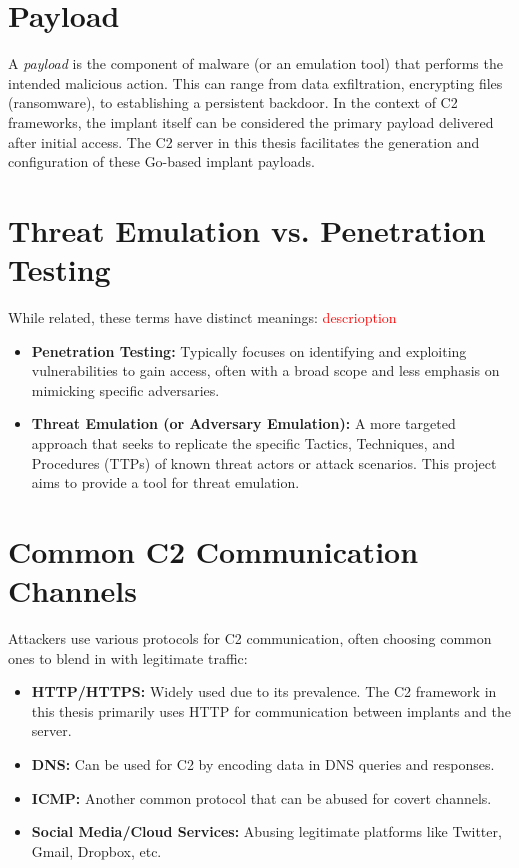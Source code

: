 \section{Payload}
\label{sec:payload_definition}
A \textit{payload} is the component of malware (or an emulation tool) that performs the intended malicious action. This can range from data exfiltration, encrypting files (ransomware), to establishing a persistent backdoor. In the context of C2 frameworks, the implant itself can be considered the primary payload delivered after initial access. The C2 server in this thesis facilitates the generation and configuration of these Go-based implant payloads.

\section{Threat Emulation vs. Penetration Testing}
\label{sec:emulation_vs_pentest}
While related, these terms have distinct meanings:
\textcolor{red}{descrioption}
\begin{itemize}
    \item \textbf{Penetration Testing:} Typically focuses on identifying and exploiting vulnerabilities to gain access, often with a broad scope and less emphasis on mimicking specific adversaries.
    \item \textbf{Threat Emulation (or Adversary Emulation):} A more targeted approach that seeks to replicate the specific Tactics, Techniques, and Procedures (TTPs) of known threat actors or attack scenarios. This project aims to provide a tool for threat emulation.
\end{itemize}

\section{Common C2 Communication Channels}
\label{sec:c2_channels}
Attackers use various protocols for C2 communication, often choosing common ones to blend in with legitimate traffic:
\begin{itemize}
    \item \textbf{HTTP/HTTPS:} Widely used due to its prevalence. The C2 framework in this thesis primarily uses HTTP for communication between implants and the server.
    \item \textbf{DNS:} Can be used for C2 by encoding data in DNS queries and responses.
    \item \textbf{ICMP:} Another common protocol that can be abused for covert channels.
    \item \textbf{Social Media/Cloud Services:} Abusing legitimate platforms like Twitter, Gmail, Dropbox, etc.
\end{itemize}

